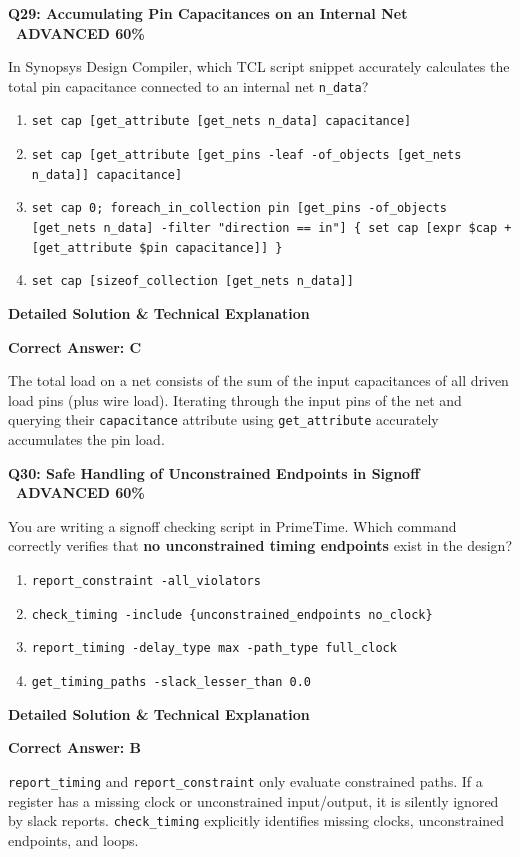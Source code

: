 \documentclass[11pt,a4paper]{article}
\newcommand{\badgeadv}{{\color{white}\colorbox{advred}{\bfseries\sffamily\tiny\ ADVANCED 60\%\ }}}
\newenvironment{qbox}[2]{%
  \begin{mdframed}[style=qstyle]%
  {\bfseries\sffamily\color{primaryblue}#1 \hfill #2}\par\vspace{2pt}%
}{%
  \end{mdframed}%
}
\newenvironment{ansbox}{%
  \begin{mdframed}[style=ansstyle]%
  {\bfseries\sffamily\color{ansgreen}\small Detailed Solution \& Technical Explanation}\par\vspace{2pt}\small%
}{%
  \end{mdframed}%
}
\begin{document}
\begin{qbox}{Q29: Accumulating Pin Capacitances on an Internal Net}{\badgeadv}
In Synopsys Design Compiler, which TCL script snippet accurately calculates the total pin capacitance connected to an internal net \texttt{n\_data}?
\begin{enumerate}[label=\textbf{\Alph*.}]
  \item \texttt{set cap [get\_attribute [get\_nets n\_data] capacitance]}
  \item \texttt{set cap [get\_attribute [get\_pins -leaf -of\_objects [get\_nets n\_data]] capacitance]}
  \item \texttt{set cap 0; foreach\_in\_collection pin [get\_pins -of\_objects [get\_nets n\_data] -filter "direction == in"] \{ set cap [expr \$cap + [get\_attribute \$pin capacitance]] \}}
  \item \texttt{set cap [sizeof\_collection [get\_nets n\_data]]}
\end{enumerate}
\end{qbox}
\begin{ansbox}
\textbf{Correct Answer: C}

The total load on a net consists of the sum of the input capacitances of all driven load pins (plus wire load). Iterating through the input pins of the net and querying their \texttt{capacitance} attribute using \texttt{get\_attribute} accurately accumulates the pin load.
\end{ansbox}

\begin{qbox}{Q30: Safe Handling of Unconstrained Endpoints in Signoff}{\badgeadv}
You are writing a signoff checking script in PrimeTime. Which command correctly verifies that \textbf{no unconstrained timing endpoints} exist in the design?
\begin{enumerate}[label=\textbf{\Alph*.}]
  \item \texttt{report\_constraint -all\_violators}
  \item \texttt{check\_timing -include \{unconstrained\_endpoints no\_clock\}}
  \item \texttt{report\_timing -delay\_type max -path\_type full\_clock}
  \item \texttt{get\_timing\_paths -slack\_lesser\_than 0.0}
\end{enumerate}
\end{qbox}
\begin{ansbox}
\textbf{Correct Answer: B}

\texttt{report\_timing} and \texttt{report\_constraint} only evaluate constrained paths. If a register has a missing clock or unconstrained input/output, it is silently ignored by slack reports. \texttt{check\_timing} explicitly identifies missing clocks, unconstrained endpoints, and loops.
\end{ansbox}
\end{document}
